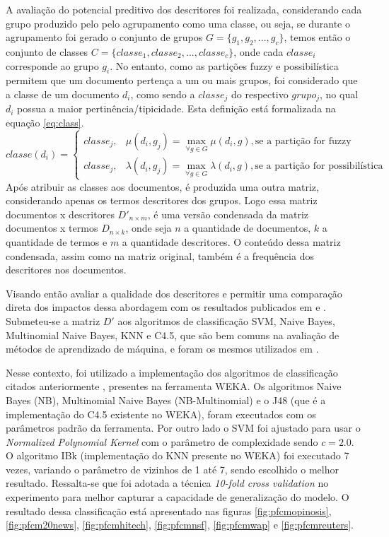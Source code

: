 A avaliação do potencial preditivo dos descritores foi realizada, considerando cada grupo produzido
pelo pelo agrupamento como uma classe, ou seja, se durante o agrupamento foi gerado o conjunto de
grupos $G = \{g_1,g_2,...,g_c\}$, temos então o conjunto de classes $C =
\{classe_1,classe_2,...,classe_c\}$, onde cada $classe_i$ corresponde ao grupo $g_i$. No entanto, como as partições fuzzy e possibilística permitem 
que
um documento pertença a um ou mais grupos, foi considerado que a classe de um documento $d_i$,
como sendo a $classe_j$ do respectivo $grupo_j$, no qual $d_i$ possua a maior
pertinência/tipicidade. Esta definição está formalizada na equação \ref{eq:class}.
\begin{equation}
  classe(d_i) = \begin{cases}
    classe_j, & \mu(d_i,g_j) = \displaystyle\max_{\forall g \in G} \mu(d_i,g), \text{se a partição
  for fuzzy}\\
  classe_j, & \lambda(d_i,g_j) = \displaystyle\max_{\forall g \in G} \lambda(d_i,g), \text{se a
  partição for possibilística}
  \end{cases}
  \label{eq:class}
\end{equation}
Após atribuir as classes aos documentos, é produzida uma outra matriz,
considerando apenas os termos descritores dos grupos. Logo essa matriz documentos x descritores
$D'_{n \times m}$, 
é uma versão condensada da matriz documentos x termos $D_{n \times k}$, onde seja $n$ a 
quantidade de documentos, $k$ a quantidade de termos e $m$ a quantidade descritores. O conteúdo
dessa matriz condensada, assim como na matriz original, também é a frequência dos descritores nos 
documentos. 

Visando então avaliar a qualidade dos descritores e permitir uma comparação direta dos impactos
dessa abordagem com os resultados publicados em  e
. Submeteu-se a matriz $D'$ 
aos algoritmos de classificação 
SVM, Naive Bayes, Multinomial Naive Bayes, KNN e C4.5, que são bem comuns na avaliação de 
métodos de aprendizado de máquina, e foram os mesmos utilizados em .

Nesse contexto, foi utilizado a implementação dos algoritmos de classificação citados anteriormente
, presentes na ferramenta WEKA\cite{weka}. Os algoritmos Naive Bayes (NB), Multinomial Naive Bayes
(NB-Multinomial) e o J48 (que é a implementação do C4.5 existente no WEKA), foram executados com os
parâmetros padrão da ferramenta. Por outro lado o SVM foi ajustado para usar o {\it Normalized
Polynomial Kernel\/} com o parâmetro de complexidade sendo $c = 2.0$. O algoritmo IBk (implementação
do KNN presente no WEKA) foi executado 7 vezes, variando o parâmetro de vizinhos de 1 até 7, sendo
escolhido o melhor resultado. Ressalta-se que foi adotada a técnica {\it 10-fold cross validation\/}
no experimento para melhor capturar a capacidade de generalização do modelo. O resultado dessa
classificação está apresentado nas figuras \ref{fig:pfcmopinosis},  \ref{fig:pfcm20news},
\ref{fig:pfcmhitech}, \ref{fig:pfcmnsf}, \ref{fig:pfcmwap} e \ref{fig:pfcmreuters}. 

